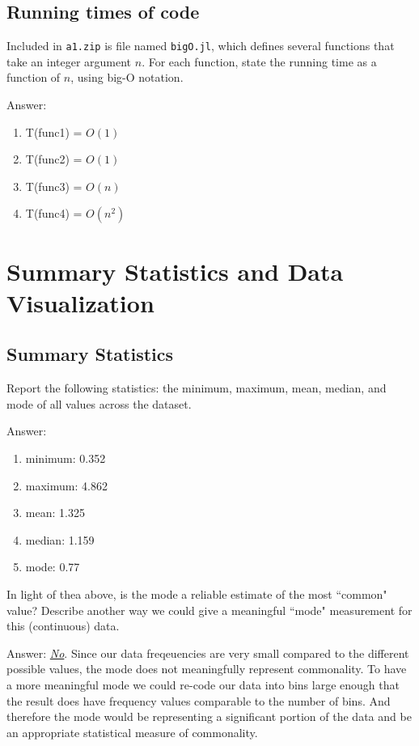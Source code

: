 \documentclass{article}
\def\ans#1{\par\gre{Answer: #1}}
\def\blu#1{{\color{blu}#1}}
\def\gre#1{{\color{gre}#1}}
\begin{document}
\subsection{Running times of code}

Included in \texttt{a1.zip} is file named \texttt{bigO.jl}, which defines several functions
that take an integer argument $n$. For each function, \blu{state the running time as a function of $n$, using big-O notation}.

\ans{
	\begin{enumerate}
		\item T(func1) = $O(1)$
		\item T(func2) = $O(1)$
		\item T(func3) = $O(n)$
		\item T(func4) = $O(n^2)$
	\end{enumerate}
}

\section{Summary Statistics and Data Visualization}

\subsection{Summary Statistics}

\blu{Report the following statistics}: the minimum, maximum, mean, median, and mode of all values across the dataset.
\ans{
	\begin{enumerate}
		\item minimum: 0.352
		\item maximum: 4.862
		\item mean: 1.325
		\item median: 1.159
		\item mode: 0.77
	\end{enumerate}
}

In light of thea above, \blu{is the mode a reliable estimate of the most ``common" value? Describe another way we could give a meaningful ``mode" measurement for this (continuous) data.}

\ans{
	\emph{\underline{No}}. Since our data freqeuencies are very small compared to the different possible values, the mode does not meaningfully represent commonality. To have a more meaningful mode we could re-code our data into bins large enough that the result does have frequency values comparable to the number of bins. And therefore the mode would be representing a significant portion of the data and be an appropriate statistical measure of commonality.
}
\end{document}
